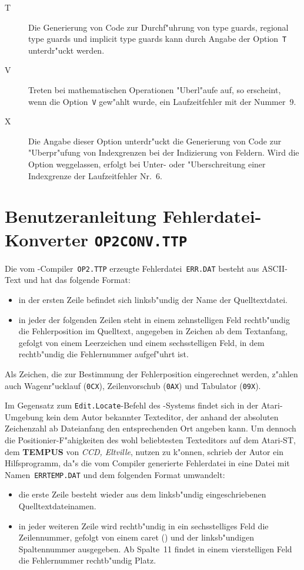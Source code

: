 \begin{description}
\item[T] Die Generierung von Code zur Durchf"uhrung von type guards, regional type
  guards und implicit type guards kann durch Angabe der Option~{\tt T} unterdr"uckt werden.
\item[V] Treten bei mathematischen Operationen "Uberl"aufe auf, so erscheint,
  wenn die Option~{\tt V} gew"ahlt wurde, ein Laufzeitfehler mit der Nummer~9.
\item[X] Die Angabe dieser Option unterdr"uckt die Generierung von Code zur
  "Uberpr"ufung von Indexgrenzen bei der Indizierung von Feldern.
  Wird die Option weggelassen, erfolgt bei Unter- oder "Uberschreitung einer
  Indexgrenze der Laufzeitfehler Nr.~6.
\end{description}

\section{Benutzeranleitung Fehlerdatei-Konverter {\tt OP2CONV.TTP}}
\label{Fehlerdatei-Konverter}

Die vom \oberon-Compiler~{\tt OP2.TTP} erzeugte Fehlerdatei~{\tt ERR.DAT}
besteht aus ASCII-Text und hat das folgende Format:
\begin{itemize}
\item in der ersten Zeile befindet sich linksb"undig der Name der Quelltextdatei.
\item in jeder der folgenden Zeilen steht in einem zehnstelligen Feld rechtb"undig
  die Fehlerposition im Quelltext, angegeben in Zeichen ab dem Textanfang,
  gefolgt von einem Leerzeichen und einem sechsstelligen Feld, in dem
  rechtb"undig die Fehlernummer aufgef"uhrt ist.
\end{itemize}
Als Zeichen, die zur Bestimmung der Fehlerposition eingerechnet werden,
z"ahlen auch Wagenr"ucklauf ({\tt 0CX}), Zeilenvorschub ({\tt 0AX}) und
Tabulator ({\tt 09X}).

Im Gegensatz zum {\tt Edit.Locate}-Befehl des \oberon-Systems findet sich
in der Atari-Umgebung kein dem Autor bekannter Texteditor, der anhand
der absoluten Zeichenzahl ab Dateianfang den entsprechenden Ort angeben kann.
Um dennoch die Positionier-F"ahigkeiten des wohl beliebtesten Texteditors auf
dem Atari-ST, dem {\bf TEMPUS} von {\it CCD, Eltville}, nutzen zu k"onnen,
schrieb der Autor ein Hilfsprogramm, da"s die vom Compiler generierte
Fehlerdatei in eine Datei mit Namen~{\tt ERRTEMP.DAT} und dem folgenden Format
umwandelt:
\begin{itemize}
\item die erste Zeile besteht wieder aus dem linksb"undig eingeschriebenen
  Quelltextdateinamen.
\item in jeder weiteren Zeile wird rechtb"undig in ein sechsstelliges Feld
  die Zeilennummer, gefolgt von einem caret (\caret) und der linksb"undigen
  Spaltennummer ausgegeben.
  Ab Spalte~11 findet in einem vierstelligen Feld die Fehlernummer rechtb"undig
  Platz.
\end{itemize}

